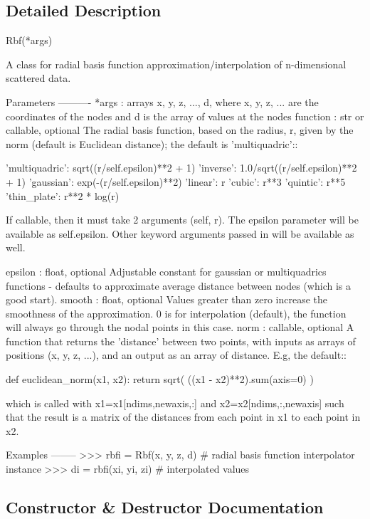 \subsection{Detailed Description}
\begin{DoxyVerb}Rbf(*args)

A class for radial basis function approximation/interpolation of
n-dimensional scattered data.

Parameters
----------
*args : arrays
    x, y, z, ..., d, where x, y, z, ... are the coordinates of the nodes
    and d is the array of values at the nodes
function : str or callable, optional
    The radial basis function, based on the radius, r, given by the norm
    (default is Euclidean distance); the default is 'multiquadric'::

        'multiquadric': sqrt((r/self.epsilon)**2 + 1)
        'inverse': 1.0/sqrt((r/self.epsilon)**2 + 1)
        'gaussian': exp(-(r/self.epsilon)**2)
        'linear': r
        'cubic': r**3
        'quintic': r**5
        'thin_plate': r**2 * log(r)

    If callable, then it must take 2 arguments (self, r).  The epsilon
    parameter will be available as self.epsilon.  Other keyword
    arguments passed in will be available as well.

epsilon : float, optional
    Adjustable constant for gaussian or multiquadrics functions
    - defaults to approximate average distance between nodes (which is
    a good start).
smooth : float, optional
    Values greater than zero increase the smoothness of the
    approximation.  0 is for interpolation (default), the function will
    always go through the nodal points in this case.
norm : callable, optional
    A function that returns the 'distance' between two points, with
    inputs as arrays of positions (x, y, z, ...), and an output as an
    array of distance.  E.g, the default::

        def euclidean_norm(x1, x2):
            return sqrt( ((x1 - x2)**2).sum(axis=0) )

    which is called with x1=x1[ndims,newaxis,:] and
    x2=x2[ndims,:,newaxis] such that the result is a matrix of the
    distances from each point in x1 to each point in x2.

Examples
--------
>>> rbfi = Rbf(x, y, z, d)  # radial basis function interpolator instance
>>> di = rbfi(xi, yi, zi)   # interpolated values\end{DoxyVerb}
 

\subsection{Constructor \& Destructor Documentation}
\hypertarget{classscipy_1_1interpolate_1_1rbf_1_1Rbf_a8430d662a0bae6c6e62a865eb3ffc76d}{}
